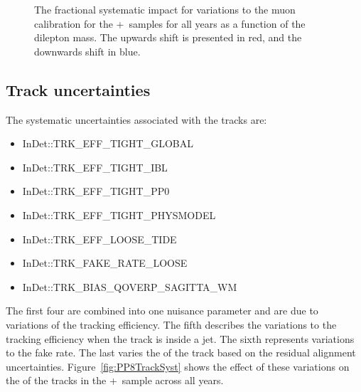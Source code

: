 {\begin{figure}[h!]
  \caption{The fractional systematic impact for variations to the muon calibration for the \powheg+\pythia~samples for all years as a function of the dilepton mass. The upwards shift is presented in red, and the downwards shift in blue.}
  \label{fig:PP8MuCalSystmll}
\end{figure}

\subsection{Track uncertainties}

The systematic uncertainties associated with the tracks are:

\begin{itemize}
  \setlength{\itemsep}{1pt}\setlength{\parskip}{0pt}\setlength{\parsep}{0pt}
  \item InDet::TRK\_EFF\_TIGHT\_GLOBAL
  \item InDet::TRK\_EFF\_TIGHT\_IBL
  \item InDet::TRK\_EFF\_TIGHT\_PP0
  \item InDet::TRK\_EFF\_TIGHT\_PHYSMODEL
  \item InDet::TRK\_EFF\_LOOSE\_TIDE
  \item InDet::TRK\_FAKE\_RATE\_LOOSE
  \item InDet::TRK\_BIAS\_QOVERP\_SAGITTA\_WM
\end{itemize}

The first four are combined into one nuisance parameter and are due to variations of the tracking efficiency. The fifth describes the variations to the tracking efficiency when the track is inside a jet.
The sixth represents variations to the fake rate. The last varies the \pt of the track based on the residual alignment uncertainties. Figure~\ref{fig:PP8TrackSyst} shows the effect of these variations on the \pt of the tracks in the \powheg+\pythia~sample across all years.

}
